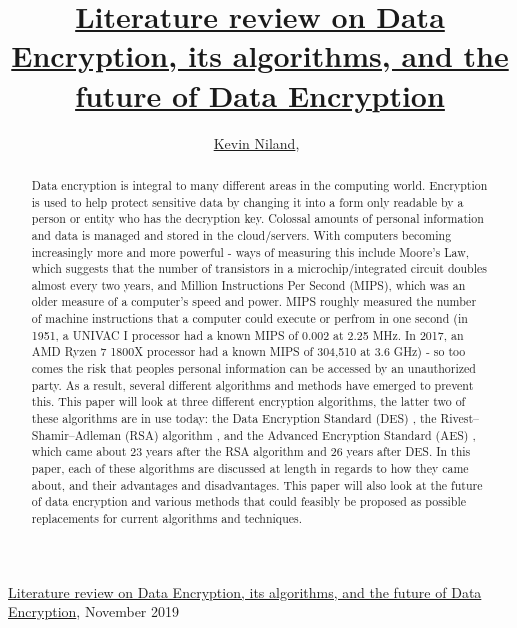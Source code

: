\documentclass[journal]{IEEEtran}
\begin{document}
{\href{https://github.com/kevinniland97/Literature-review-on-Data-Encryption-algorithm}{Literature review on Data Encryption, its algorithms, and the future of Data Encryption}, November 2019}

\title{\href{https://github.com/kevinniland97/Literature-review-on-Data-Encryption-algorithms}{Literature review on Data Encryption, its algorithms, and the future of Data Encryption}}
\author{\href{https://github.com/kevinniland97}{Kevin Niland},~}
\maketitle

\begin{abstract}
Data encryption is integral to many different areas in the computing world. Encryption is used to help protect sensitive data by changing it into a form only readable by a person or entity who has the decryption key. Colossal amounts of personal information and data is managed and stored in the cloud/servers. With computers becoming increasingly more and more powerful - ways of measuring this include Moore's Law, which suggests that the number of transistors in a microchip/integrated circuit doubles almost every two years, and Million Instructions Per Second (MIPS), which was an older measure of a computer's speed and power. MIPS roughly measured the number of machine instructions that a computer could execute or perfrom in one second (in 1951, a UNIVAC I processor had a known MIPS of 0.002 at 2.25 MHz. In 2017, an AMD Ryzen 7 1800X processor had a known MIPS of 304,510 at 3.6 GHz) - so too comes the risk that peoples personal information can be accessed by an unauthorized party. As a result, several different algorithms and methods have emerged to prevent this. This paper will look at three different encryption algorithms, the latter two of these algorithms are in use today: the Data Encryption Standard (DES) \cite{des}, the Rivest–Shamir–Adleman (RSA) algorithm \cite{rsa}, and the Advanced Encryption Standard (AES) \cite{aes}, which came about 23 years after the RSA algorithm and 26 years after DES. In this paper, each of these algorithms are discussed at length in regards to how they came about, and their advantages and disadvantages. This paper will also look at the future of data encryption and various methods that could feasibly be proposed as possible replacements for current algorithms and techniques. 
\end{abstract}
\end{document}
